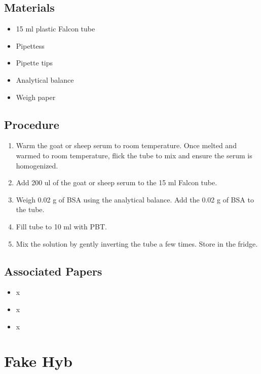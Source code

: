 \documentclass[
  letterpaper,
  DIV=11,
  numbers=noendperiod]{scrreprt}
\providecommand{\tightlist}{%
  \setlength{\itemsep}{0pt}\setlength{\parskip}{0pt}}\usepackage{longtable,booktabs,array}
\begin{document}
\hypertarget{materials-100}{%
\section{Materials}\label{materials-100}}

\begin{itemize}
\tightlist
\item
  15 ml plastic Falcon tube
\item
  Pipettess
\item
  Pipette tips
\item
  Analytical balance
\item
  Weigh paper
\end{itemize}

\hypertarget{procedure-99}{%
\section{Procedure}\label{procedure-99}}

\begin{enumerate}
\def\labelenumi{\arabic{enumi}.}
\item
  Warm the goat or sheep serum to room temperature. Once melted and
  warmed to room temperature, flick the tube to mix and ensure the serum
  is homogenized.
\item
  Add 200 ul of the goat or sheep serum to the 15 ml Falcon tube.
\item
  Weigh 0.02 g of BSA using the analytical balance. Add the 0.02 g of
  BSA to the tube.
\item
  Fill tube to 10 ml with PBT.
\item
  Mix the solution by gently inverting the tube a few times. Store in
  the fridge.
\end{enumerate}

\hypertarget{associated-papers-74}{%
\section{Associated Papers}\label{associated-papers-74}}

\begin{itemize}
\tightlist
\item
  x
\item
  x
\item
  x
\end{itemize}

\hypertarget{sec-recipe-fake_hyb}{%
\chapter{Fake Hyb}\label{sec-recipe-fake_hyb}}
\end{document}

